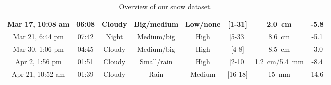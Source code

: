 \begin{table}[htbp]
\begin{tabular}{|c|c|c|c|c|c|c|c|}
        Mar 17, 10:08 am   &  06:08            & Cloudy        & Big/medium          & Low/none         & [1-31]                         & \SI{2.0}{\cm}                & -5.8  \\\hline
        Mar 21, 6:44 pm    &  07:42            & Night         & Medium/big          & High             & [5-33]                         & \SI{8.6}{\cm}                & -5.1  \\\hline
        Mar 30, 1:06 pm    &  04:45            & Cloudy        & Medium/big          & High             & [4-8]                          & \SI{8.5}{\cm}                & -3.0  \\\hline
        Apr 2, 1:56 pm     &  01:51            & Cloudy        & Small/rain          & High             & [2-10]                         & \SI{1.2}{\cm}/\SI{5.4}{\mm}  & -8.4  \\\hline
        Apr 21, 10:52 am   &  01:39            & Cloudy        & Rain                & Medium           & [16-18]                        & \SI{15}{\mm}                 & 14.6  \\\hline
    \end{tabular}
    \caption{Overview of our snow dataset.}
    \label{tab:overview-dataset}
\end{table}

